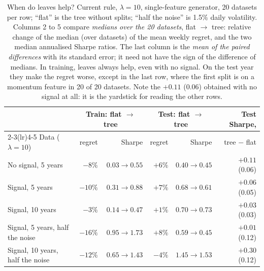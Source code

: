 \documentclass[11pt,a4paper]{article}
\newcommand{\1}{\mathbf{1}}
\begin{document}
\begin{table}[H]
\centering\small
\begin{tabular}{@{}l rr rr r@{}}
\toprule
& \multicolumn{2}{c}{Train: flat $\to$ tree} & \multicolumn{2}{c}{Test: flat $\to$ tree} & Test Sharpe,\\
\cmidrule(lr){2-3}\cmidrule(lr){4-5}
Data ($\lambda=10$) & regret & Sharpe & regret & Sharpe & tree $-$ flat\\
\midrule
No signal, 5 years & $-8\%$ & $0.03\to0.55$ & $+6\%$ & $0.40\to0.45$ & $+0.11$ (0.06)\\
Signal, 5 years & $-10\%$ & $0.31\to0.88$ & $+7\%$ & $0.68\to0.61$ & $+0.06$ (0.05)\\
Signal, 10 years & $-3\%$ & $0.14\to0.47$ & $+1\%$ & $0.70\to0.73$ & $+0.03$ (0.03)\\
Signal, 5 years, half the noise & $-16\%$ & $0.95\to1.73$ & $+8\%$ & $0.59\to0.45$ & $+0.01$ (0.12)\\
Signal, 10 years, half the noise & $-12\%$ & $0.65\to1.43$ & $-4\%$ & $1.45\to1.53$ & $+0.30$ (0.12)\\
\bottomrule
\end{tabular}
\caption{When do leaves help? Current rule, $\lambda=10$, single-feature generator, 20 datasets per row; ``flat'' is the tree without splits; ``half the noise'' is 1.5\% daily volatility. Columns 2 to 5 compare \emph{medians over the 20 datasets}, flat $\to$ tree: relative change of the median (over datasets) of the mean weekly regret, and the two median annualised Sharpe ratios. The last column is the \emph{mean of the paired differences} with its standard error; it need not have the sign of the difference of medians. In training, leaves always help, even with no signal. On the test year they make the regret worse, except in the last row, where the first split is on a momentum feature in 20 of 20 datasets. Note the $+0.11$ (0.06) obtained with no signal at all: it is the yardstick for reading the other rows.}
\label{tab:leaves}
\end{table}
\end{document}
